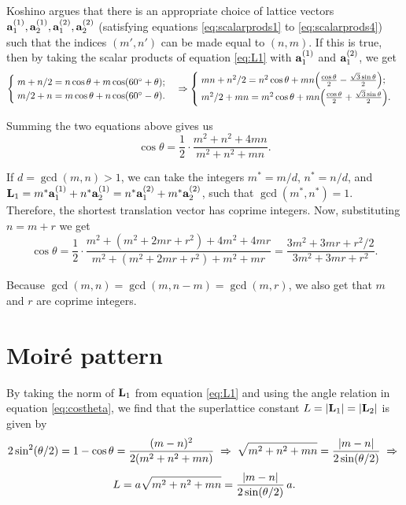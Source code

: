 \documentclass[a4paper,10pt]{article}
\begin{document}
Koshino \cite{koshino2012} argues that there is an appropriate choice of lattice vectors $\vb{a}_1^{(1)}, \vb{a}_2^{(1)}, \vb{a}_1^{(2)}, \vb{a}_2^{(2)}$ (satisfying equations \ref{eq:scalarprods1} to \ref{eq:scalarprods4}) such that the indices $(m',n')$ can be made equal to $(n,m)$. If this is true, then by taking the scalar products of equation \ref{eq:L1} with $\vb{a}_1^{(1)}$ and $\vb{a}_1^{(2)}$, we get
$$
\begin{cases}
\; m + n/2 = n \cos\theta + m \cos(60^\circ + \theta); \\
\; m/2 + n = m \cos\theta + n \cos(60^\circ - \theta).
\end{cases}
\Rightarrow
\begin{cases}
\; mn + n^2/2 = n^2 \cos\theta + mn \qty(\frac{\cos\theta}{2}
- \frac{\sqrt{3} \sin\theta}{2}); \\
\; m^2/2 + mn = m^2 \cos\theta + mn \qty(\frac{\cos\theta}{2}
+ \frac{\sqrt{3} \sin\theta}{2}).
\end{cases}
$$

Summing the two equations above gives us
\begin{equation} \label{eq:costheta}
\boxed{\cos\theta = \frac{1}{2} \cdot \frac{m^2 + n^2 + 4mn}{m^2 + n^2 + mn}.}
\end{equation}

If $d = \gcd(m, n) > 1$, we can take the integers $m^* = m/d$, $n^* = n/d$, and $\vb{L}_1 = m^*\vb{a}_1^{(1)} + n^*\vb{a}_2^{(1)} = n^*\vb{a}_1^{(2)} + m^*\vb{a}_2^{(2)}$, such that $\gcd(m^*, n^*) = 1$. Therefore, the shortest translation vector has coprime integers. Now, substituting $n = m + r$ we get
\begin{equation} \label{eq:costheta-r}
\boxed{\cos\theta = \frac{1}{2} \cdot \frac{m^2 + (m^2 + 2mr + r^2) + 4m^2 + 4mr}{m^2 + (m^2 + 2mr + r^2) + m^2 + mr} =
\frac{3 m^2 + 3mr + r^2/2}{3m^2 + 3mr + r^2}. }
\end{equation}

Because $\gcd(m, n) = \gcd(m, n-m) = \gcd(m, r)$, we also get that $m$ and $r$ are coprime integers.


\pagebreak

\section{Moiré pattern}

By taking the norm of $\vb{L}_1$ from equation \ref{eq:L1} and using the angle relation in equation \ref{eq:costheta}, we find that the superlattice constant $L = \abs{\vb{L}_1} = \abs{\vb{L}_2}$ is given by
$$
2\sin[2](\theta/2) = 1 - \cos\theta = \frac{(m-n)^2}{2(m^2+n^2+mn)} \; \Rightarrow \;
\sqrt{m^2+n^2+mn} = \frac{\abs{m-n}}{2\sin(\theta/2)} \; \Rightarrow \;
$$
\begin{equation} \label{eq:}
L = a\sqrt{m^2 + n^2 + mn} = \frac{\abs{m-n}}{2 \sin(\theta/2)} \, a.
\end{equation}
\end{document}
